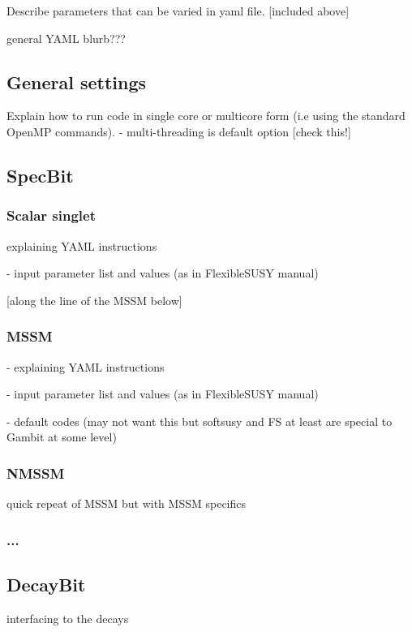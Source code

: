 \documentclass[11pt,a4paper]{article}
\begin{document}
Describe parameters that can be varied in yaml file. [included above]

general YAML blurb???

\subsection{General settings}

Explain how to run code in single core or multicore form (i.e using the standard OpenMP commands).
- multi-threading is default option [check this!]

\subsection{SpecBit}

\subsubsection{Scalar singlet}

explaining YAML instructions 

- input parameter list and values (as in FlexibleSUSY manual)

[along the line of the MSSM below]

\subsubsection{MSSM}

- explaining YAML instructions 

- input parameter list and values (as in FlexibleSUSY manual)

- default codes 
(may not want this but softsusy and FS at least 
are special to Gambit at some level) 

\subsubsection{NMSSM}

    quick repeat of MSSM but with MSSM specifics

\subsubsection{...}

\subsection{DecayBit}

interfacing to the decays
\end{document}

